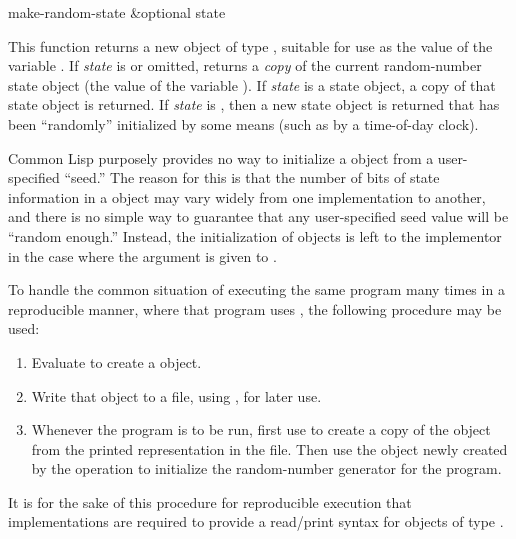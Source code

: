 \begin{defun}[Function]
make-random-state &optional state

This function returns a new object of type ,
suitable for use as the value of the variable .
If \emph{state} is {\false} or omitted,  returns a \emph{copy}
of the current random-number state object (the value of
the variable ).  If \emph{state} is a state object,
a copy of that state object is returned.  If \emph{state} is {\true},
then a new state object is returned that has been ``randomly''
initialized by some means (such as by a time-of-day clock).

\beforenoterule
\begin{rationale}
Common Lisp purposely provides no way to initialize a 
object from a user-specified ``seed.''  The reason for this is that
the number of bits of state information in a  object
may vary widely from one implementation to another, and there is no
simple way to guarantee that any user-specified seed value will be
``random enough.''  Instead, the initialization of 
objects is left to the implementor in the case where the argument {\true}
is given to .

To handle the common situation of executing the same program many times
in a reproducible manner, where that program uses , the following
procedure may be used:
\begin{enumerate}
\item
Evaluate  to create a  object.

\item
Write that object to a file, using , for later use.

\item
Whenever the program is to be run, first use  to create
a copy of the  object from the printed representation
in the file.
Then use the  object newly created by the  operation
to initialize the random-number generator for the program.
\end{enumerate}
It is for the sake of this procedure for reproducible execution that
implementations are required to provide a read/print syntax for objects
of type .


\end{rationale}
\end{defun}
